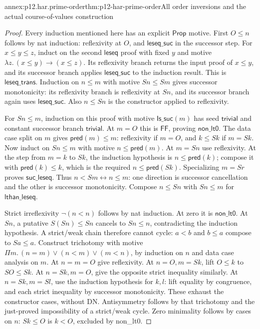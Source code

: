 \begin{annexitem}{annex:p12.har.prime-order}{thm:p12-har-prime-order}{All order inversions and the actual course-of-values construction}
\begin{proof}
Every induction mentioned here has an explicit \(\mathsf{Prop}\)
motive. First \(O\le n\) follows by nat induction: reflexivity at
\(O\), and \(\mathsf{leseq\_suc}\) in the successor step.
For \(x\le y\le z\), induct on the second \(\mathsf{leseq}\) proof
with fixed \(y\) and motive \(\lambda z.\,(x\le y)\to(x\le z)\).
Its reflexivity branch returns the input proof of \(x\le y\), and
its successor branch applies \(\mathsf{leseq\_suc}\) to the induction
result. This is \(\mathsf{leseq\_trans}\).
Induction on \(n\le m\) with motive \(S n\le S m\) gives successor
monotonicity: its reflexivity branch is reflexivity at \(S n\), and
its successor branch again uses \(\mathsf{leseq\_suc}\).
Also \(n\le S n\) is the constructor applied to reflexivity.

For \(S n\le m\), induction on this proof with motive
\(\mathsf{Is\_suc}(m)\) has seed \(\mathsf{trivial}\) and constant
successor branch \(\mathsf{trivial}\). At \(m=O\) this is
\(\mathsf{FF}\), proving \(\mathsf{non\_lt0}\).
The data case split on \(m\) gives \(\mathsf{pred}(m)\le m\):
reflexivity if \(m=O\), and \(k\le S k\) if \(m=S k\).
Now induct on \(S n\le m\) with motive \(n\le\mathsf{pred}(m)\).
At \(m=S n\) use reflexivity. At the step from \(m=k\) to \(S k\),
the induction hypothesis is \(n\le\mathsf{pred}(k)\);
compose it with \(\mathsf{pred}(k)\le k\), which is the required
\(n\le\mathsf{pred}(S k)\). Specializing \(m=S r\) proves
\(\mathsf{suc\_leseq}\). Thus
\(n<S m\leftrightarrow n\le m\): one direction is successor
cancellation and the other is successor monotonicity.
Compose \(n\le S n\) with \(S n\le m\) for
\(\mathsf{lthan\_leseq}\).

Strict irreflexivity \(\neg(n<n)\) follows by nat induction. At
zero it is \(\mathsf{non\_lt0}\). At \(S n\), a putative
\(S(S n)\le S n\) cancels to \(S n\le n\), contradicting the
induction hypothesis. A strict/weak chain therefore cannot cycle:
\(a<b\) and \(b\le a\) compose to \(S a\le a\).
Construct trichotomy with motive
\(\Pi m.\,(n=m)\vee(n<m)\vee(m<n)\), by induction on \(n\)
and data case analysis on \(m\). At \(n=m=O\) give reflexivity.
At \(n=O,m=S k\), lift \(O\le k\) to \(S O\le S k\).
At \(n=S k,m=O\), give the opposite strict inequality similarly.
At \(n=S k,m=S l\), use the induction hypothesis for \(k,l\):
lift equality by congruence, and each strict inequality by successor
monotonicity. These exhaust the constructor cases, without DN.
Antisymmetry follows by that trichotomy and the just-proved impossibility
of a strict/weak cycle. Zero minimality follows by cases on \(n\):
\(S k\le O\) is \(k<O\), excluded by non_lt0.


\end{proof}
\end{annexitem}

